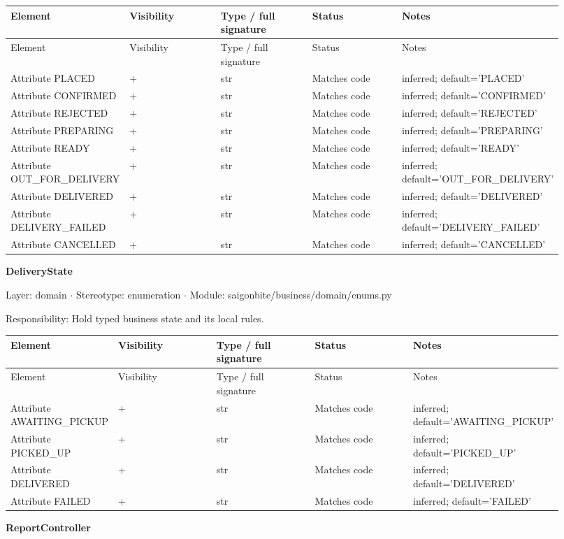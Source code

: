 \begin{longtable}{>{\raggedright\arraybackslash}p{0.1840\linewidth}>{\raggedright\arraybackslash}p{0.1840\linewidth}>{\raggedright\arraybackslash}p{0.1840\linewidth}>{\raggedright\arraybackslash}p{0.1840\linewidth}>{\raggedright\arraybackslash}p{0.1840\linewidth}}
Element & Visibility & Type / full signature & Status & Notes \\
\hline\endfirsthead
Element & Visibility & Type / full signature & Status & Notes \\
\hline\endhead
Attribute PLACED & + & str & Matches code & inferred; default='PLACED' \\
Attribute CONFIRMED & + & str & Matches code & inferred; default='CONFIRMED' \\
Attribute REJECTED & + & str & Matches code & inferred; default='REJECTED' \\
Attribute PREPARING & + & str & Matches code & inferred; default='PREPARING' \\
Attribute READY & + & str & Matches code & inferred; default='READY' \\
Attribute OUT\_FOR\_DELIVERY & + & str & Matches code & inferred; default='OUT\_FOR\_DELIVERY' \\
Attribute DELIVERED & + & str & Matches code & inferred; default='DELIVERED' \\
Attribute DELIVERY\_FAILED & + & str & Matches code & inferred; default='DELIVERY\_FAILED' \\
Attribute CANCELLED & + & str & Matches code & inferred; default='CANCELLED' \\
\end{longtable}
\textbf{DeliveryState}

Layer: domain \ensuremath{\cdot} Stereotype: \guillemotleft{}enumeration\guillemotright{} \ensuremath{\cdot} Module: saigonbite/business/domain/enums.py

Responsibility: Hold typed business state and its local rules.

\begin{longtable}{>{\raggedright\arraybackslash}p{0.1840\linewidth}>{\raggedright\arraybackslash}p{0.1840\linewidth}>{\raggedright\arraybackslash}p{0.1840\linewidth}>{\raggedright\arraybackslash}p{0.1840\linewidth}>{\raggedright\arraybackslash}p{0.1840\linewidth}}
Element & Visibility & Type / full signature & Status & Notes \\
\hline\endfirsthead
Element & Visibility & Type / full signature & Status & Notes \\
\hline\endhead
Attribute AWAITING\_PICKUP & + & str & Matches code & inferred; default='AWAITING\_PICKUP' \\
Attribute PICKED\_UP & + & str & Matches code & inferred; default='PICKED\_UP' \\
Attribute DELIVERED & + & str & Matches code & inferred; default='DELIVERED' \\
Attribute FAILED & + & str & Matches code & inferred; default='FAILED' \\
\end{longtable}
\textbf{ReportController}

